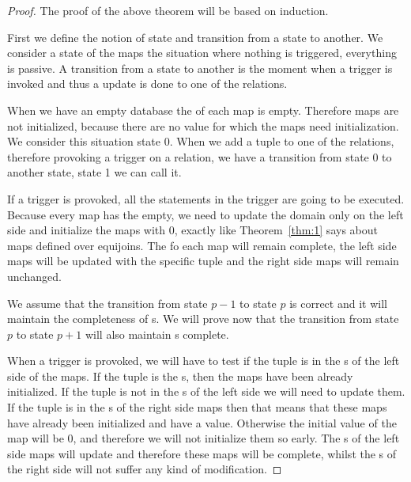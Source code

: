 \documentclass[12pt]{article}
\begin{document}
\begin{proof}
The proof of the above theorem will be based on induction.

First we define the notion of state and transition from a state to another. We consider a state of the maps the situation where nothing is triggered, everything is passive. A transition from a state to another is the moment when a trigger is invoked and thus a update is done to one of the relations.

When we have an empty database the \dom{} of each map is empty. Therefore maps are not initialized, because there are no value for which the maps need initialization. We consider this situation state 0. When we add a tuple to one of the relations, therefore provoking a trigger on a relation, we have a transition from state 0 to another state, state 1 we can call it. 

If a trigger is provoked, all the statements in the trigger are going to be executed. Because every map has the \dom{} empty, we need to update the domain only on the left side and initialize the maps with 0, exactly like Theorem~\ref{thm:1} says about maps defined over equijoins. The \dom{} fo each map will remain complete, the left side maps will be updated with the specific tuple and the right side maps will remain unchanged.

We assume that the transition from state $p-1$ to state $p$ is correct and it will maintain the completeness of \dom{}s. We will prove now that the transition from state $p$ to state $p+1$ will also maintain \dom{}s complete.

When a trigger is provoked, we will have to test if the tuple is in the \dom{}s of the left side of the maps. If the tuple is the \dom{}s, then the maps have been already initialized. If the tuple is not in the \dom{}s of the left side we will need to update them. If the tuple is in the \dom{}s of the right side maps then that means that these maps have already been initialized and have a value. Otherwise the initial value of the map will be 0, and therefore we will not initialize them so early. The \dom{}s of the left side maps will update and therefore these maps will be complete, whilst the \dom{}s of the right side will not suffer any kind of modification.
\end{proof}
\end{document}
